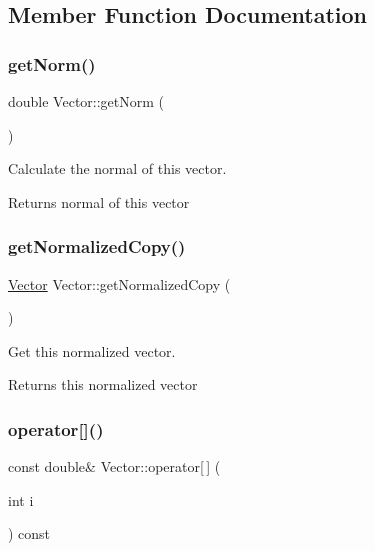 \subsection{Member Function Documentation}
\mbox{\label{classVector_ac9ec1192304bb0bae095eaa958187db2}} 
\subsubsection{\texorpdfstring{get\+Norm()}{getNorm()}}
{\footnotesize\ttfamily double Vector\+::get\+Norm (\begin{DoxyParamCaption}{ }\end{DoxyParamCaption})\hspace{0.3cm}{\ttfamily [inline]}}



Calculate the normal of this vector. 

\begin{DoxyReturn}{Returns}
normal of this vector 
\end{DoxyReturn}
\mbox{\label{classVector_ae247b2764bb2832be89c5721386d003a}} 
\subsubsection{\texorpdfstring{get\+Normalized\+Copy()}{getNormalizedCopy()}}
{\footnotesize\ttfamily \hyperlink{classVector}{Vector} Vector\+::get\+Normalized\+Copy (\begin{DoxyParamCaption}{ }\end{DoxyParamCaption})\hspace{0.3cm}{\ttfamily [inline]}}



Get this normalized vector. 

\begin{DoxyReturn}{Returns}
this normalized vector 
\end{DoxyReturn}
\mbox{\label{classVector_ae78b4372ba99bf1f50cb76078f48df99}} 
\subsubsection{\texorpdfstring{operator[]()}{operator[]()}}
{\footnotesize\ttfamily const double\& Vector\+::operator\mbox{[}$\,$\mbox{]} (\begin{DoxyParamCaption}\item[{int}]{i }\end{DoxyParamCaption}) const\hspace{0.3cm}{\ttfamily [inline]}}



